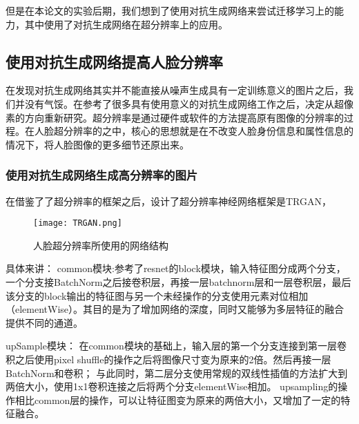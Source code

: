但是在本论文的实验后期，我们想到了使用对抗生成网络来尝试迁移学习上的能力，其中使用了对抗生成网络在超分辨率上的应用。
\subsection{使用对抗生成网络提高人脸分辨率}
在发现对抗生成网络其实并不能直接从噪声生成具有一定训练意义的图片之后，我们并没有气馁。在参考了很多具有使用意义的对抗生成网络工作之后，决定从超像素的方向重新研究。超分辨率是通过硬件或软件的方法提高原有图像的分辨率的过程。在人脸超分辨率的之中，核心的思想就是在不改变人脸身份信息和属性信息的情况下，将人脸图像的更多细节还原出来。
\subsubsection{使用对抗生成网络生成高分辨率的图片}
在借鉴了了超分辨率的框架之后，设计了超分辨率神经网络框架是TRGAN\cite{TRGAN}，
\begin{figure}[!ht]
\centering
\texttt{[image: TRGAN.png]}
\caption{人脸超分辨率所使用的网络结构}
\end{figure}

具体来讲：
common模块:参考了resnet\cite{RESNET}的block模块，输入特征图分成两个分支，一个分支接BatchNorm之后接卷积层，再接一层batchnorm层和一层卷积层，最后该分支的block输出的特征图与另一个未经操作的分支使用元素对位相加（elementWise）。其目的是为了增加网络的深度，同时又能够为多层特征的融合提供不同的通道。

upSample模块：
在common模块的基础上，输入层的第一个分支连接到第一层卷积之后使用pixel shuffle\cite{ESPCN}的操作之后将图像尺寸变为原来的2倍。然后再接一层BatchNorm和卷积；
与此同时，第二层分支使用常规的双线性插值的方法扩大到两倍大小，使用1x1卷积连接之后将两个分支elementWise相加。
upsampling的操作相比common层的操作，可以让特征图变为原来的两倍大小，又增加了一定的特征融合。


